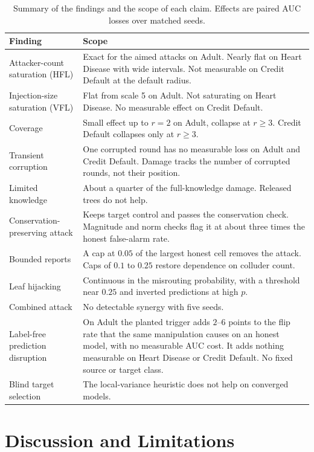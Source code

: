 \documentclass[11pt]{article}
\begin{document}
\begin{table}[htbp]
\centering
\caption{Summary of the findings and the scope of each claim. Effects are paired AUC losses over matched seeds.}\label{tab:summary}
\begin{tabular}{p{4.0cm}p{9.8cm}}
\toprule
Finding & Scope \\
\midrule
Attacker-count saturation (HFL) & Exact for the aimed attacks on Adult. Nearly flat on Heart Disease with wide intervals. Not measurable on Credit Default at the default radius. \\
Injection-size saturation (VFL) & Flat from scale 5 on Adult. Not saturating on Heart Disease. No measurable effect on Credit Default. \\
Coverage & Small effect up to $r=2$ on Adult, collapse at $r\geq3$. Credit Default collapses only at $r\geq3$. \\
Transient corruption & One corrupted round has no measurable loss on Adult and Credit Default. Damage tracks the number of corrupted rounds, not their position. \\
Limited knowledge & About a quarter of the full-knowledge damage. Released trees do not help. \\
Conservation-preserving attack & Keeps target control and passes the conservation check. Magnitude and norm checks flag it at about three times the honest false-alarm rate. \\
Bounded reports & A cap at $0.05$ of the largest honest cell removes the attack. Caps of $0.1$ to $0.25$ restore dependence on colluder count. \\
Leaf hijacking & Continuous in the misrouting probability, with a threshold near $0.25$ and inverted predictions at high $p$. \\
Combined attack & No detectable synergy with five seeds. \\
Label-free prediction disruption & On Adult the planted trigger adds $2$--$6$ points to the flip rate that the same manipulation causes on an honest model, with no measurable AUC cost. It adds nothing measurable on Heart Disease or Credit Default. No fixed source or target class. \\
Blind target selection & The local-variance heuristic does not help on converged models. \\
\bottomrule
\end{tabular}
\end{table}

\FloatBarrier

\section{Discussion and Limitations}
\label{sec:discussion}
\end{document}
